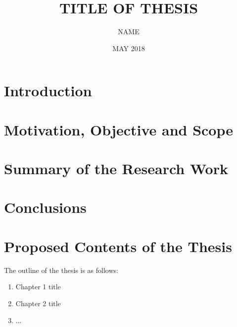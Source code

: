 \documentclass[PhD,synopsis]{iitmdiss}
\title{TITLE OF THESIS}
\author{NAME}
\date{MAY 2018}
\begin{document}
\maketitle



\setcounter{page}{0}
\section{Introduction}

\section{Motivation, Objective and Scope}

\section{Summary of the Research Work}

\section{Conclusions}



\begin{singlespace}
%

\end{singlespace}




\section{Proposed Contents of the Thesis}
The outline of the thesis is as follows:
\begin{enumerate}
\item Chapter 1 title
\item Chapter 2 title
\item ...
\end{enumerate}
\end{document}
